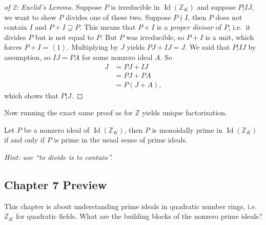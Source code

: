 \begin{proof}[of 2: Euclid's Lemma]

Suppose \(P\) is irreducible in \(\operatorname{Id}({\mathbb{Z}}_K)\)
and suppose \(P \mathrel{\Big|}IJ\), we want to show \(P\) divides one
of these two. Suppose \(P\nmid I\), then \(P\) does not contain \(I\)
and \(P+I \supsetneq P\). This means that \(P+I\) is a \emph{proper
divisor} of \(P\), i.e.~it divides \(P\) but is not equal to \(P\). But
\(P\) was irreducible, so \(P+I\) is a unit, which forces
\(P + I = \left\langle{ 1 }\right\rangle\). Multiplying by \(J\) yields
\(PJ + IJ = J\). We said that \(P \mathrel{\Big|}IJ\) by assumption, so
\(IJ = PA\) for some nonzero ideal \(A\). So
\begin{align*}
J 
&= PJ + IJ \\
&= PJ + PA \\ 
&= P(J + A)
,\end{align*}
which shows that \(P\mathrel{\Big|}J\).

\end{proof}

\begin{remark}

Now running the exact same proof as for \({\mathbb{Z}}\) yields unique
factorization.

\end{remark}

\begin{exercise}[?]

Let \(P\) be a nonzero ideal of \(\operatorname{Id}({\mathbb{Z}}_K)\),
then \(P\) is monoidally prime in \(\operatorname{Id}({\mathbb{Z}}_K)\)
if and only if \(P\) is prime in the usual sense of prime ideals.

\emph{Hint: use ``to divide is to contain''.}

\end{exercise}

\hypertarget{chapter-7-preview}{%
\subsection{Chapter 7 Preview}\label{chapter-7-preview}}

\begin{remark}

This chapter is about understanding prime ideals in quadratic number
rings, i.e.~\({\mathbb{Z}}_K\) for quadratic fields. What are the
building blocks of the nonzero prime ideals?

\end{remark}

